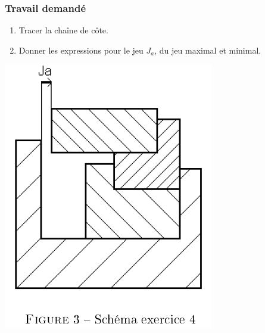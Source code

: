 \subsubsection{Travail demandé}
\begin{enumerate}
\item Tracer la chaîne de côte.
\item Donner les expressions pour le jeu $J_a$, du jeu maximal et minimal.
\end{enumerate}

\newpage


\begin{center}
\includegraphics[scale=0.5]{png/box.png}
\end{center}

